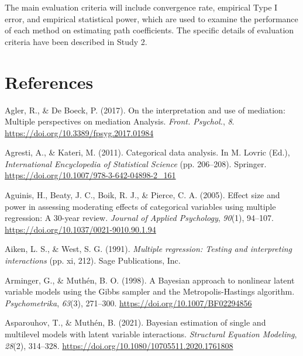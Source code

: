 \documentclass[
  11pt,
  man]{apa6}
\newlength{\cslhangindent}
\newlength{\cslentryspacingunit} %
\newenvironment{CSLReferences}[2] %
 {%
  \setlength{\parindent}{0pt}
  \ifodd #1
  \let\oldpar\par
  \def\par{\hangindent=\cslhangindent\oldpar}
  \fi
  \setlength{\parskip}{#2\cslentryspacingunit}
 }%
 {}
\begin{document}
The main evaluation criteria will include convergence rate, empirical Type I error, and empirical statistical power, which are used to examine the performance of each method on estimating path coefficients. The specific details of evaluation criteria have been described in Study 2.

\newpage

\hypertarget{references}{%
\section{References}\label{references}}

\hypertarget{refs}{}
\begin{CSLReferences}{1}{0}
\leavevmode{}%
Agler, R., \& De Boeck, P. (2017). On the {interpretation} and {use} of {mediation}: {Multiple perspectives} on {mediation Analysis}. \emph{Front. Psychol.}, \emph{8}. \url{https://doi.org/10.3389/fpsyg.2017.01984}

\leavevmode{}%
Agresti, A., \& Kateri, M. (2011). Categorical {data analysis}. In M. Lovric (Ed.), \emph{International {Encyclopedia} of {Statistical Science}} (pp. 206--208). Springer. \url{https://doi.org/10.1007/978-3-642-04898-2_161}

\leavevmode{}%
Aguinis, H., Beaty, J. C., Boik, R. J., \& Pierce, C. A. (2005). Effect {size} and {power} in {assessing moderating effects} of {categorical variables using multiple regression}: {A} 30-{year review}. \emph{Journal of Applied Psychology}, \emph{90}(1), 94--107. \url{https://doi.org/10.1037/0021-9010.90.1.94}

\leavevmode{}%
Aiken, L. S., \& West, S. G. (1991). \emph{Multiple regression: {Testing} and interpreting interactions} (pp. xi, 212). Sage Publications, Inc.

\leavevmode{}%
Arminger, G., \& Muthén, B. O. (1998). A {Bayesian} approach to nonlinear latent variable models using the {Gibbs} sampler and the {Metropolis-Hastings} algorithm. \emph{Psychometrika}, \emph{63}(3), 271--300. \url{https://doi.org/10.1007/BF02294856}

\leavevmode{}%
Asparouhov, T., \& Muthén, B. (2021). Bayesian estimation of single and multilevel models with latent variable interactions. \emph{Structural Equation Modeling}, \emph{28}(2), 314--328. \url{https://doi.org/10.1080/10705511.2020.1761808}


\end{CSLReferences}
\end{document}
